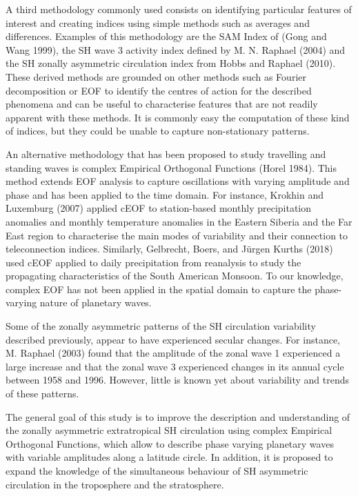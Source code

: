 \documentclass[smallextended]{svjour3}       %
\begin{document}
A third methodology commonly used consists on identifying particular features of interest and creating indices using simple methods such as averages and differences.
Examples of this methodology are the SAM Index of (Gong and Wang 1999), the SH wave 3 activity index defined by M. N. Raphael (2004) and the SH zonally asymmetric circulation index from Hobbs and Raphael (2010).
These derived methods are grounded on other methods such as Fourier decomposition or EOF to identify the centres of action for the described phenomena and can be useful to characterise features that are not readily apparent with these methods.
It is commonly easy the computation of these kind of indices, but they could be unable to capture non-stationary patterns.

An alternative methodology that has been proposed to study travelling and standing waves is complex Empirical Orthogonal Functions (Horel 1984).
This method extends EOF analysis to capture oscillations with varying amplitude and phase and has been applied to the time domain.
For instance, Krokhin and Luxemburg (2007) applied cEOF to station-based monthly precipitation anomalies and monthly temperature anomalies in the Eastern Siberia and the Far East region to characterise the main modes of variability and their connection to teleconnection indices.
Similarly, Gelbrecht, Boers, and Jürgen Kurths (2018) used cEOF applied to daily precipitation from reanalysis to study the propagating characteristics of the South American Monsoon.
To our knowledge, complex EOF has not been applied in the spatial domain to capture the phase-varying nature of planetary waves.

Some of the zonally asymmetric patterns of the SH circulation variability described previously, appear to have experienced secular changes.
For instance, M. Raphael (2003) found that the amplitude of the zonal wave 1 experienced a large increase and that the zonal wave 3 experienced changes in its annual cycle between 1958 and 1996.
However, little is known yet about variability and trends of these patterns.

The general goal of this study is to improve the description and understanding of the zonally asymmetric extratropical SH circulation using complex Empirical Orthogonal Functions, which allow to describe phase varying planetary waves with variable amplitudes along a latitude circle.
In addition, it is proposed to expand the knowledge of the simultaneous behaviour of SH asymmetric circulation in the troposphere and the stratosphere.
\end{document}

